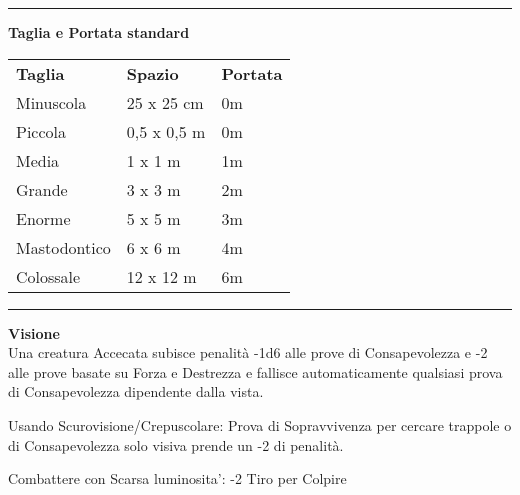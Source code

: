 \documentclass[a4paper,12 pt,openany]{book}
\newcommand{\riga}{\rule{\textwidth}{0.4pt}}
\begin{document}
\begin{textblock*}{8.3cm}
\riga

\textbf{Taglia e Portata standard}\\
\begin{tabular}{lll}
\textbf{Taglia}& \textbf{Spazio} &\textbf{Portata}\\
Minuscola & 25 x 25 cm&0m\\
Piccola & 0,5 x 0,5 m &0m\\
Media & 1 x 1 m & 1m\\
Grande & 3 x 3 m& 2m\\
Enorme & 5 x 5 m &3m\\
Mastodontico & 6 x 6 m&4m\\
Colossale & 12 x 12 m&6m\\
\end{tabular}

\riga

\textbf{Visione}\\

Una creatura Accecata subisce penalità -1d6 alle prove di Consapevolezza e -2 alle prove basate su Forza e Destrezza e fallisce automaticamente qualsiasi prova di Consapevolezza dipendente dalla vista.

Usando Scurovisione/Crepuscolare: Prova di Sopravvivenza per cercare trappole o di Consapevolezza solo visiva prende un -2 di penalità.

Combattere con Scarsa luminosita': -2 Tiro per Colpire


\end{textblock*}
\end{document}
